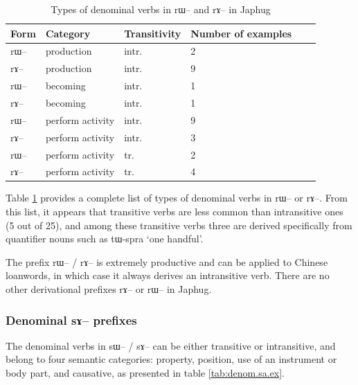 \documentclass[oldfontcommands,oneside,a4paper,11pt]{article}
\newcommand{\ipa}[1]{{\phon \mbox{#1}}} %
\begin{document}
  \begin{table}[H] \label{tab:denom.ra.list}
 \caption{Types of denominal verbs in \ipa{rɯ}-- and \ipa{rɤ}-- in Japhug}
\begin{tabular}{llllll}
\toprule
Form & Category &Transitivity&  Number of examples  \\
\midrule
\ipa{rɯ}--& production & intr. & 2\\
\ipa{rɤ}--& production & intr. & 9\\
\ipa{rɯ}--& becoming & intr. & 1\\
\ipa{rɤ}--& becoming & intr. & 1\\
\ipa{rɯ}--& perform activity & intr. &9\\
\ipa{rɤ}--& perform activity & intr. & 3\\
\ipa{rɯ}--& perform activity & tr. &2\\
\ipa{rɤ}--& perform activity & tr. & 4\\
\bottomrule
\end{tabular}
\end{table} 
Table \ref{tab:denom.ra.list} provides a complete list of types of denominal verbs in \ipa{rɯ}-- or \ipa{rɤ}--. From this list, it appears that transitive verbs are less common than intransitive ones (5 out of 25), and among these transitive verbs three are derived specifically from quantifier nouns such as \ipa{tɯ-spra} `one handful'.

The prefix \ipa{rɯ}-- / \ipa{rɤ}-- is extremely productive and can be applied to Chinese loanwords, in which case it always derives an intransitive verb. There are no other derivational prefixes \ipa{rɤ}-- or \ipa{rɯ}-- in Japhug.

\subsubsection{Denominal \ipa{sɤ}-- prefixes} \label{subsubsec:sa}
The denominal verbs in \ipa{sɯ}-- / \ipa{sɤ}-- can be either transitive or intransitive, and belong to four semantic categories: property, position, use of an instrument or body part, and causative, as presented in table \ref{tab:denom.sa.ex}.
\end{document}

